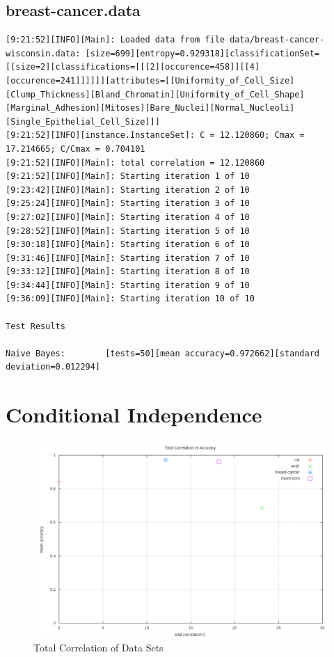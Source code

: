 \documentclass[10pt]{report}
\begin{document}
\subsection*{breast-cancer.data}
{\small
\begin{verbatim}
[9:21:52][INFO][Main]: Loaded data from file data/breast-cancer-wisconsin.data: [size=699][entropy=0.929318][classificationSet=[[size=2][classifications=[[[2][occurence=458]][[4][occurence=241]]]]]][attributes=[[Uniformity_of_Cell_Size][Clump_Thickness][Bland_Chromatin][Uniformity_of_Cell_Shape][Marginal_Adhesion][Mitoses][Bare_Nuclei][Normal_Nucleoli][Single_Epithelial_Cell_Size]]] 
[9:21:52][INFO][instance.InstanceSet]: C = 12.120860; Cmax = 17.214665; C/Cmax = 0.704101 
[9:21:52][INFO][Main]: total correlation = 12.120860 
[9:21:52][INFO][Main]: Starting iteration 1 of 10 
[9:23:42][INFO][Main]: Starting iteration 2 of 10 
[9:25:24][INFO][Main]: Starting iteration 3 of 10 
[9:27:02][INFO][Main]: Starting iteration 4 of 10 
[9:28:52][INFO][Main]: Starting iteration 5 of 10 
[9:30:18][INFO][Main]: Starting iteration 6 of 10 
[9:31:46][INFO][Main]: Starting iteration 7 of 10 
[9:33:12][INFO][Main]: Starting iteration 8 of 10 
[9:34:44][INFO][Main]: Starting iteration 9 of 10 
[9:36:09][INFO][Main]: Starting iteration 10 of 10 

Test Results

Naive Bayes:		[tests=50][mean accuracy=0.972662][standard deviation=0.012294] 
\end{verbatim}
}


\section{Conditional Independence}

\begin{figure}
  \begin{center}
	\includegraphics[width=\textwidth,height=!]{correlation}
  \end{center}
  \caption{Total Correlation of Data Sets}
  \label{fig:correlation}
\end{figure} 
\end{document}
